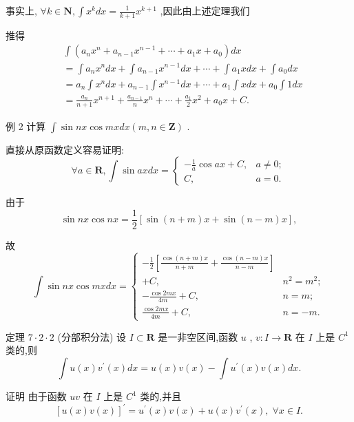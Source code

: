 事实上, $\forall k \in  \mathbf{N},\int {x}^{k}{dx} = \frac{1}{k + 1}{x}^{k + 1}$ ,因此由上述定理我们

推得
\begin{align*}
	&\int \left( {{a}_{n}{x}^{n} + {a}_{n - 1}{x}^{n - 1} + \cdots  + {a}_{1}x + {a}_{0}}\right) {dx}\\
	&= \int {a}_{n}{x}^{n}{dx} + \int {a}_{n - 1}{x}^{n - 1}{dx} + \cdots  + \int {a}_{1}{xdx} + \int {a}_{0}{dx}\\
	&= {a}_{n}\int {x}^{n}{dx} + {a}_{n - 1}\int {x}^{n - 1}{dx} + \cdots  + {a}_{1}\int x{dx} + {a}_{0}\int {1dx}\\
	&= \frac{{a}_{n}}{n + 1}{x}^{n + 1} + \frac{{a}_{n - 1}}{n}{x}^{n} + \cdots  + \frac{{a}_{1}}{2}{x}^{2} + {a}_{0}x + C.
\end{align*}

例 2 计算 $\int \sin {nx}\cos {mxdx}\left( {m,n \in  \mathbf{Z}}\right)$ .

直接从原函数定义容易证明:
$$\forall a \in  \mathbf{R},\int \sin {axdx} = \left\{  \begin{array}{ll}  - \frac{1}{a}\cos {ax} + C, & a \neq  0; \\  C, & a = 0. \end{array}\right.$$

由于
$$\sin {nx}\cos {nx} = \frac{1}{2}\left\lbrack  {\sin \left( {n + m}\right) x + \sin \left( {n - m}\right) x}\right\rbrack  ,$$

故
$$\int \sin {nx}\cos {mxdx} = \left\{  \begin{array}{ll}  - \frac{1}{2}\left\lbrack  {\frac{\cos \left( {n + m}\right) x}{n + m} + \frac{\cos \left( {n - m}\right) x}{n - m}}\right\rbrack  & \\   + C, & {n}^{2} = {m}^{2}; \\   - \frac{\cos {2mx}}{4m} + C, & n = m; \\  \frac{\cos {2mx}}{4m} + C, & n =  - m. \end{array}\right.$$

定理 $7 \cdot  2 \cdot  2$ (分部积分法) 设 $I \subset  \mathbf{R}$ 是一非空区间,函数 $u$ , $v : I \rightarrow  \mathbf{R}$ 在 $I$ 上是 ${C}^{1}$ 类的,则
$$\int u\left( x\right) {v}^{\prime }\left( x\right) {dx} = u\left( x\right) v\left( x\right)  - \int {u}^{\prime }\left( x\right) v\left( x\right) {dx}.$$

证明 由于函数 ${uv}$ 在 $I$ 上是 ${C}^{1}$ 类的,并且
$${\left\lbrack  u\left( x\right) v\left( x\right) \right\rbrack  }^{\prime } = {u}^{\prime }\left( x\right) v\left( x\right)  + u\left( x\right) {v}^{\prime }\left( x\right) ,\;\forall x \in  I.$$

